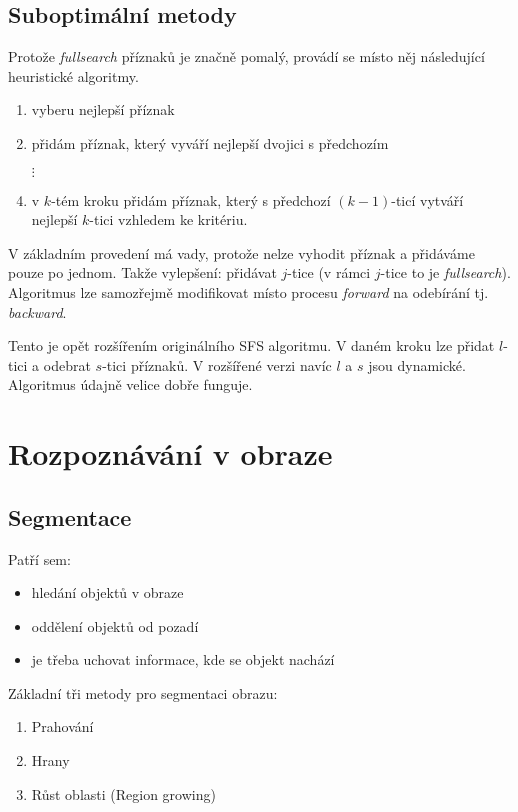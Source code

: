  


\subsection{Suboptimální metody}
Protože {\em fullsearch} příznaků je značně pomalý, provádí se místo něj následující heuristické algoritmy.

\begin{enumerate}
\item vyberu nejlepší příznak
\item přidám příznak, který vyváří nejlepší dvojici s předchozím
\item[$\vdots$]
\item v $k$-tém kroku přidám příznak, který s předchozí $(k-1)$-ticí vytváří nejlepší $k$-tici vzhledem ke kritériu.
\end{enumerate}

V základním provedení má vady, protože nelze vyhodit příznak a přidáváme pouze po jednom. Takže vylepšení:
přidávat $j$-tice (v rámci $j$-tice to je {\em fullsearch}). Algoritmus lze samozřejmě modifikovat 
místo procesu {\em forward} na odebírání tj. {\em backward}.

Tento je opět rozšířením originálního SFS algoritmu. V daném kroku lze přidat $l$-tici a odebrat $s$-tici příznaků.
V rozšířené verzi navíc $l$ a $s$ jsou dynamické. Algoritmus údajně velice dobře funguje. 

\section{Rozpoznávání v obraze}
\subsection{Segmentace}
Patří sem:
\begin{itemize}
\item hledání objektů v obraze
\item oddělení objektů od pozadí
\item je třeba uchovat informace, kde se objekt nachází
\end{itemize}

Základní tři metody pro segmentaci obrazu:
\begin{enumerate}
\item Prahování
\item Hrany
\item Růst oblasti (Region growing)
\end{enumerate}


